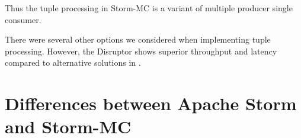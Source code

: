Thus the tuple processing in Storm-MC is a variant of multiple producer single consumer.

There were several other options we considered when implementing tuple processing. However, the Disruptor shows superior throughput and latency compared to alternative solutions in \cite{something}.


\section{Differences between Apache Storm and Storm-MC}
\label{sec:differences}

